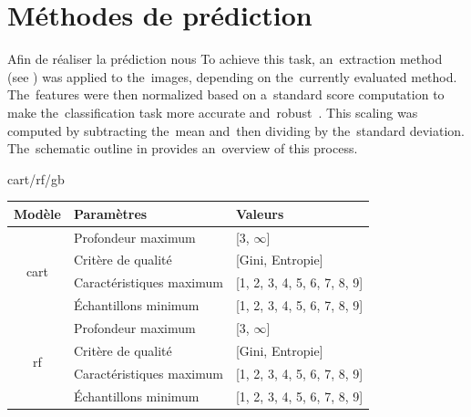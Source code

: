 \section{Méthodes de prédiction}
Afin de réaliser la prédiction nous 
To achieve this task, an~extraction method (see ) was applied to the~images, depending on the~currently evaluated method. The~features were then normalized based on a~standard score computation to make the~classification task more accurate and~robust~\cite{Graf2001}. This scaling was computed by subtracting the~mean and~then dividing by the~standard deviation. The~schematic outline in  provides an~overview of this process.\par
\gls{cart}/\gls{rf}/\gls{gb}


\begin{table}[H]
    \centering
    \begin{tabular}{cll}
        \toprule
        \textbf{Modèle}                                 & \textbf{Paramètres}       & \textbf{Valeurs}                          \\ \midrule
        \multirow{4}{*}{\gls{cart}}                     & Profondeur maximum        & [3, $\infty$]                             \\ \cmidrule{2-3} 
                                                        & Critère de qualité        & [Gini, Entropie]                          \\ \cmidrule{2-3}   
                                                        & Caractéristiques maximum  & [1, 2, 3, 4, 5, 6, 7, 8, 9]               \\ \cmidrule{2-3}   
                                                        & Échantillons minimum      & [1, 2, 3, 4, 5, 6, 7, 8, 9]               \\ \midrule 
        \multirow{4}{*}{\gls{rf}}                       & Profondeur maximum        & [3, $\infty$]                             \\ \cmidrule{2-3} 
                                                        & Critère de qualité        & [Gini, Entropie]                          \\ \cmidrule{2-3}   
                                                        & Caractéristiques maximum  & [1, 2, 3, 4, 5, 6, 7, 8, 9]               \\ \cmidrule{2-3}   
                                                        & Échantillons minimum      & [1, 2, 3, 4, 5, 6, 7, 8, 9]               \\ \midrule 

\end{tabular}
\end{table}
